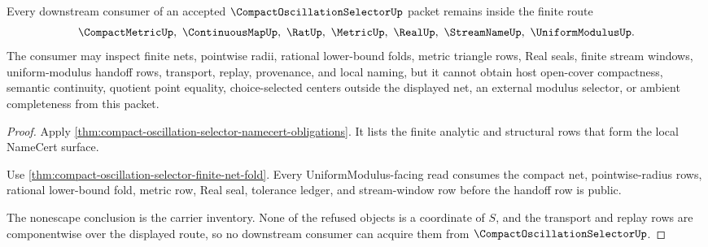 \begin{theorem}
\label{thm:compact-oscillation-selector-nonescape}
Every downstream consumer of an accepted $\CompactOscillationSelectorUp$ packet remains inside the finite route
$$
\CompactMetricUp,\ \ContinuousMapUp,\ \RatUp,\ \MetricUp,\ \RealUp,\ \StreamNameUp,\ \UniformModulusUp .
$$
The consumer may inspect finite nets, pointwise radii, rational lower-bound folds, metric triangle rows, Real seals, finite stream windows, uniform-modulus handoff rows, transport, replay, provenance, and local naming, but it cannot obtain host open-cover compactness, semantic continuity, quotient point equality, choice-selected centers outside the displayed net, an external modulus selector, or ambient completeness from this packet.
\end{theorem}
\begin{proof}
Apply \autoref{thm:compact-oscillation-selector-namecert-obligations}. It lists the finite analytic and structural rows that form the local NameCert surface.

Use \autoref{thm:compact-oscillation-selector-finite-net-fold}. Every UniformModulus-facing read consumes the compact net, pointwise-radius rows, rational lower-bound fold, metric row, Real seal, tolerance ledger, and stream-window row before the handoff row is public.

The nonescape conclusion is the carrier inventory. None of the refused objects is a coordinate of $S$, and the transport and replay rows are componentwise over the displayed route, so no downstream consumer can acquire them from $\CompactOscillationSelectorUp$.
\end{proof}


\begin{closurestatus}{\CompactOscillationSelectorUp}
  \theoryclosure{\seedClosure}
  \formalstatus{\unformalizedV}
\end{closurestatus}
